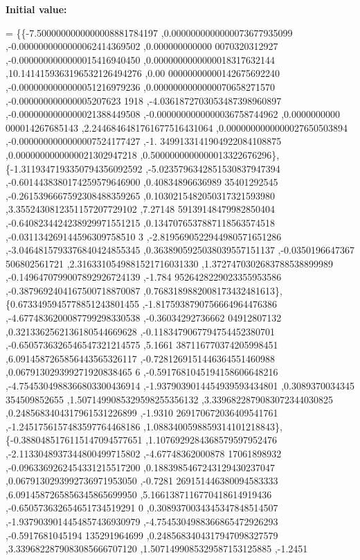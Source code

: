 {\bfseries Initial value\+:}
\begin{DoxyCode}
= \{\{-7.5000000000000008881784197 ,0.0000000000000073677935099 ,-0.0000000000000062414369502 ,0.000000000000
      0070320312927 ,-0.0000000000000015416940450 ,0.0000000000000018317632144 ,10.1414159363196532126494276 ,0.00
      00000000000142675692240 ,-0.0000000000000051216979236 ,0.0000000000000070658271570 ,-0.000000000000005207623
      1918 ,-4.0361872703053487398960897 ,-0.0000000000000021388449508 ,-0.0000000000000036758744962 ,0.0000000000
      000014267685143 ,2.2446846481761677516431064 ,0.0000000000000027650503894 ,-0.0000000000000007524177427 ,-1.
      3499133141904922084108875 ,0.0000000000000021302947218 ,0.5000000000000013322676296\},
\{-1.3119347193350794356092592 ,-5.0235796342851530837947394 ,-0.6014438380174259579646900 ,0.40834896636989
      35401292545 ,-0.2615396667592308488359265 ,0.1030215482050317321593980 ,3.3552430812351157207729102 ,7.27148
      59139148479982850404 ,-0.6408234424238929971551215 ,0.1347076537887118563574518 ,-0.031134269144596309758510
      3 ,-2.8195690522944980571651286 ,-3.0464815793376840424855345 ,0.3638905925038039557151137 ,-0.0350196647367
      506802561721 ,2.3163310549881521716031330 ,1.3727470302683788538899989 ,-0.1496470799007892926724139 ,-1.784
      9526428229023355953586 ,-0.3879692404167500718870087 ,0.7683189882008173432481613\},
\{0.6733495945778851243801455 ,-1.8175938790756664964476386 ,-4.6774836200087799298330538 ,-0.36034292736662
      04912807132 ,0.3213362562136180544669628 ,-0.1183479067794754452380701 ,-0.6505736326546547321214575 ,5.1661
      387116770374205998451 ,6.0914587265856443565326117 ,-0.7281269151446364551460988 ,0.067913029399271920838465
      6 ,-0.5917681045194158606648216 ,-4.7545304988366803300436914 ,-1.9379039014454939593434801 ,0.3089370034345
      354509852655 ,1.5071499085329598255356132 ,3.3396822879083072344030825 ,0.2485683404317961531226899 ,-1.9310
      269170672036409541761 ,-1.2451756157483597764468186 ,1.0883400598859314101218843\},
\{-0.3880485176115147094577651 ,1.1076929284368579597952476 ,-2.1133048937344800499715802 ,-4.67748362000878
      17061898932 ,-0.0963369262454331215517200 ,0.1883985467243129430237047 ,0.0679130293992736971953050 ,-0.7281
      269151446380094583333 ,6.0914587265856345865699950 ,5.1661387116770418614919436 ,-0.650573632654651734519291
      0 ,0.3089370034345347848514507 ,-1.9379039014454857436930979 ,-4.7545304988366865472926293 ,-0.5917681045194
      135291964699 ,0.2485683404317947098327579 ,3.3396822879083085666707120 ,1.5071499085329587153125885 ,-1.2451

\end{DoxyCode}

